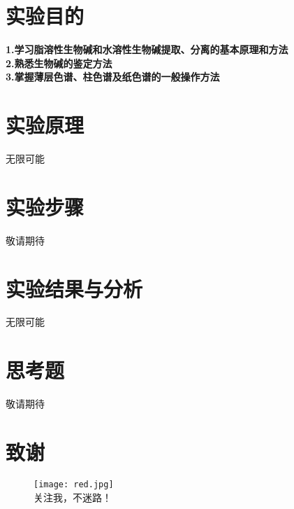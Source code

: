 \documentclass[12pt,a4paper]{article}
\begin{document}
\section{实验目的}
\textbf{1.学习脂溶性生物碱和水溶性生物碱提取、分离的基本原理和方法}\\
\textbf{2.熟悉生物碱的鉴定方法}\\
\textbf{3.掌握薄层色谱、柱色谱及纸色谱的一般操作方法}\\
\section{实验原理}
无限可能
\section{实验步骤}
敬请期待
\section{实验结果与分析}
无限可能
\section{思考题}
敬请期待
\section{致谢}
\begin{figure}[h]
\centering
\texttt{[image: red.jpg]}\\[24pt]
关注我，不迷路！
\end{figure}
\end{document}
